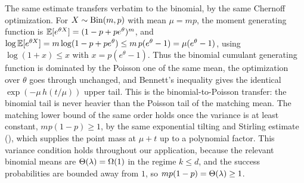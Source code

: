 The same estimate transfers verbatim to the binomial, by the same Chernoff optimization. For $X\sim\mathrm{Bin}(m,p)$ with mean
$\mu=mp$, the moment generating function is $\mathbb{E}[e^{\theta X}]=(1-p+pe^{\theta})^m$, and $\log\mathbb{E}[e^{\theta X}]=m\log(1-p+pe^
{\theta})\le m\,p(e^{\theta}-1)=\mu(e^{\theta}-1)$, using $\log(1+x)\le x$ with $x=p(e^{\theta}-1)$. Thus the binomial
cumulant generating function is dominated by the Poisson one of the same mean, the optimization over $\theta$ goes through
unchanged, and Bennett's inequality gives the identical $\exp(-\mu\,h(t/\mu))$ upper tail. This is the binomial-to-Poisson
transfer: the binomial tail is never heavier than the Poisson tail of the matching mean. The matching lower bound of the same
order holds once the variance is at least constant, $mp(1-p)\ge1$, by the same exponential tilting and Stirling estimate
(), which supplies the point mass at $\mu+t$ up to a polynomial factor. This variance condition holds throughout our
application, because the relevant binomial means are $\Theta(\lambda)=\Omega(1)$ in the regime $k\le d$, and the success probabilities
are bounded away from $1$, so $mp(1-p)=\Theta(\lambda)\ge1$.
